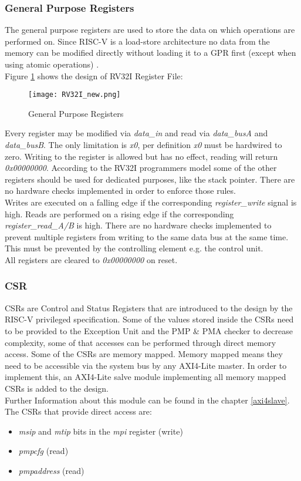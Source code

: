 \subsubsection{General Purpose Registers}
The general purpose registers are used to store the data on which operations are performed on. Since RISC-V is a load-store architecture no data from the memory can be modified directly without loading it to a \ac{GPR} first (except when using atomic operations) \cite{riscv:unprivileged}.\\
Figure \ref{fig:gppr} shows the design of \ac{RV32I} Register File:
\begin{figure}[H]
	\centering
	\texttt{[image: RV32I\_new.png]}
	\caption{General Purpose Registers}
	\label{fig:gppr}
\end{figure}
Every register may be modified via \textit{data\_in} and read via \textit{data\_busA} and \textit{data\_busB}.
The only limitation is \textit{x0}, per definition \textit{x0} must be hardwired to zero. Writing to the register is allowed but has no effect, reading will return \textit{0x00000000}.
According to the RV32I programmers model some of the other registers should be
used for dedicated purposes, like the stack pointer. There are no hardware checks
implemented in order to enforce those rules.\\
Writes are executed on a falling edge if the corresponding \textit{register\_write} signal is high. Reads are performed on a rising edge if the corresponding \textit{register\_read\_A/B} is high. There are no hardware checks implemented to prevent multiple registers from writing to the same data bus at the same time. This must be prevented by the controlling element e.g. the control unit.\\
All registers are cleared to \textit{0x00000000} on reset.
\subsubsection{\acf{CSR}}
CSRs are Control and Status Registers that are introduced to the design by the
RISC-V privileged specification. Some of the values stored inside the CSRs need to
be provided to the Exception Unit and the PMP \& PMA checker to decrease
complexity, some of that accesses can be performed through direct memory access.
Some of the CSRs are memory mapped. Memory mapped means they need to be
accessible via the system bus by any AXI4-Lite master. In order to implement this,
an AXI4-Lite salve module implementing all memory mapped CSRs is added to the
design.\\
Further Information about this module can be found in the chapter \ref{axi4slave}.
The CSRs that provide direct access are:
\begin{itemize}
	\item \textit{msip} and \textit{mtip} bits in the \textit{mpi} register (write)
	\item \textit{pmpcfg} (read)
	\item \textit{pmpaddress} (read)
\end{itemize}

